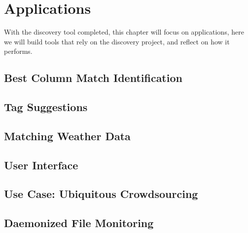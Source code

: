 \chapter{Applications}\label{ch:applications}
With the discovery tool completed, this chapter will focus on applications, here we will build tools that rely on the
discovery project, and reflect on how it performs.


\section{Best Column Match Identification}\label{sec:best-column-match-id}



\section{Tag Suggestions}\label{sec:tag-suggestions}



\section{Matching Weather Data}\label{sec:matching-weather-data}



\section{User Interface}\label{sec:user-interface}



\section{Use Case: Ubiquitous Crowdsourcing}\label{sec:ubiquitous-crowdsourcing}



\section{Daemonized File Monitoring}


